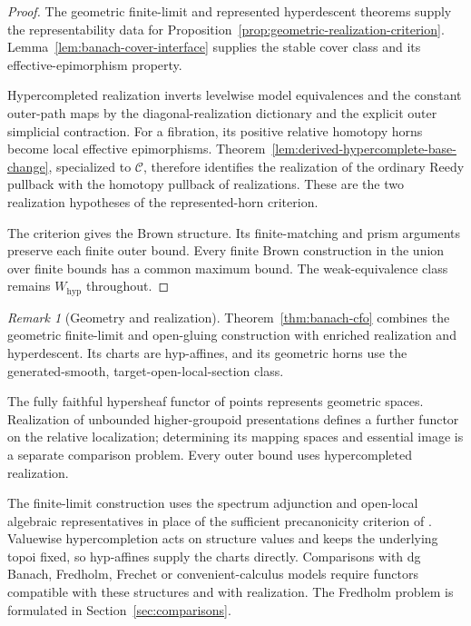 \documentclass[12pt]{amsart}
\theoremstyle{definition}
\theoremstyle{remark}
\newtheorem{rem}[thm]{Remark}
\numberwithin{equation}{section}
\begin{document}
\begin{proof}
The geometric finite-limit and represented hyperdescent
theorems supply the representability
data for
Proposition~\ref{prop:geometric-realization-criterion}.
Lemma~\ref{lem:banach-cover-interface} supplies the
stable cover class and its effective-epimorphism
property.

Hypercompleted realization inverts levelwise model
equivalences and the constant outer-path maps by
the diagonal-realization dictionary and the
explicit outer simplicial contraction.
For a fibration, its positive relative homotopy
horns become local effective epimorphisms.
Theorem~\ref{lem:derived-hypercomplete-base-change},
specialized to $\mathcal C$, therefore identifies
the realization of the ordinary Reedy pullback
with the homotopy pullback of realizations.
These are the two realization hypotheses of the
represented-horn criterion.

The criterion gives the Brown structure.
Its finite-matching and prism arguments preserve
each finite outer bound. Every finite Brown
construction in the union over finite bounds has
a common maximum bound. The weak-equivalence
class remains $W_{\mathrm{hyp}}$ throughout.
\end{proof}

\begin{rem}[Geometry and realization]
\label{rem:banach-nonclaims}
Theorem~\ref{thm:banach-cfo} combines the geometric
finite-limit and open-gluing construction with enriched
realization and hyperdescent. Its charts are hyp-affines,
and its geometric horns use the generated-smooth,
target-open-local-section class.

The fully faithful hypersheaf functor of points represents
geometric spaces. Realization of unbounded higher-groupoid
presentations defines a further functor on the relative
localization; determining its mapping spaces and essential
image is a separate comparison problem. Every outer bound
uses hypercompleted realization.

The finite-limit construction uses the spectrum adjunction
and open-local algebraic representatives in place of the
sufficient precanonicity criterion of
\cite[Proposition~2.3.21, p.~58]{LurieDAGV2009}.
Valuewise hypercompletion acts on structure values and
keeps the underlying topoi fixed, so hyp-affines supply
the charts directly. Comparisons with dg Banach,
Fredholm, Frechet or convenient-calculus models require
functors compatible with these structures and with
realization. The Fredholm problem is formulated in
Section~\ref{sec:comparisons}.
\end{rem}
\end{document}
